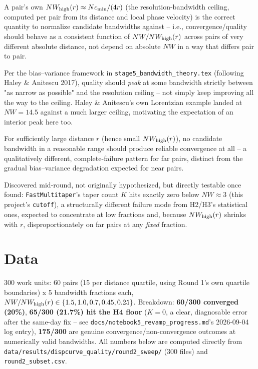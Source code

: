\documentclass[11pt]{article}
\begin{document}
\begin{description}[leftmargin=1.5em]
  \item[H1 --- Normalized bandwidth is the right variable.] A pair's own $NW_{\rm high}(r) \approx
    Nc_{\min}/(4r)$ (the resolution-bandwidth ceiling, computed per pair from its distance and
    local phase velocity) is the correct quantity to normalize candidate bandwidths against --
    i.e., convergence/quality should behave as a consistent function of $NW/NW_{\rm high}(r)$
    across pairs of very different absolute distance, not depend on absolute $NW$ in a way that
    differs pair to pair.
  \item[H2 --- An interior MSE optimum exists.] Per the bias--variance framework in
    \texttt{stage5\_bandwidth\_theory.tex} (following Haley \& Anitescu 2017), quality should
    \emph{peak} at some bandwidth strictly between "as narrow as possible" and the resolution
    ceiling -- not simply keep improving all the way to the ceiling. Haley \& Anitescu's own
    Lorentzian example landed at $NW=14.5$ against a much larger ceiling, motivating the
    expectation of an interior peak here too.
  \item[H3 --- An existence threshold produces a cliff for far pairs.] For sufficiently large
    distance $r$ (hence small $NW_{\rm high}(r)$), no candidate bandwidth in a reasonable range
    should produce reliable convergence at all -- a qualitatively different, complete-failure
    pattern for far pairs, distinct from the gradual bias--variance degradation expected for near
    pairs.
  \item[H4 --- A hard numerical floor exists below $NW\approx 3$.] Discovered mid-round, not
    originally hypothesized, but directly testable once found: \texttt{FastMultitaper}'s taper
    count $K$ hits exactly zero below $NW\approx 3$ (this project's \texttt{cutoff}), a
    structurally different failure mode from H2/H3's statistical ones, expected to concentrate at
    low fractions and, because $NW_{\rm high}(r)$ shrinks with $r$, disproportionately on far
    pairs at any \emph{fixed} fraction.
\end{description}

\section{Data}

300 work units: 60 pairs (15 per distance quartile, using Round 1's own quartile boundaries) x 5
bandwidth fractions each, $NW/NW_{\rm high}(r) \in \{1.5, 1.0, 0.7, 0.45, 0.25\}$. Breakdown:
\textbf{60/300 converged (20\%)}, \textbf{65/300 (21.7\%) hit the H4 floor} ($K=0$, a clear,
diagnosable error after the same-day fix -- see \texttt{docs/notebook5\_revamp\_progress.md}'s
2026-09-04 log entry), \textbf{175/300} are genuine convergence/non-convergence outcomes at
numerically valid bandwidths. All numbers below are computed directly from
\texttt{data/results/dispcurve\_quality/round2\_sweep/} (300 files) and \texttt{round2\_subset.csv}.
\end{document}
